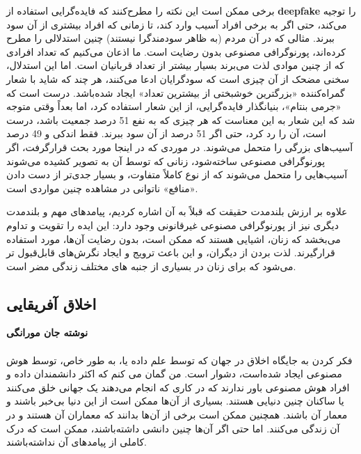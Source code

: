 برخی ممکن است این نکته را مطرح‌کنند که فایده‌گرایی استفاده از \textenglish{\textbf{deepfake}} را توجیه می‌کند، حتی اگر به برخی افراد آسیب وارد کند، تا زمانی که افراد بیشتری از آن سود ببرند.
مثالی که در آن مردم (به ظاهر سودمند‌گرا نیستند) چنین استدلالی را مطرح کرده‌اند، پورنوگرافی مصنوعی بدون رضایت است.
ما اذعان می‌کنیم که تعداد افرادی که از چنین موادی لذت می‌برند بسیار بیشتر از تعداد قربانیان است.
اما این استدلال، سخنی مضحک از آن چیزی است که سودگرایان ادعا می‌کنند، هر چند که شاید با شعار گمراه‌کننده «بزرگترین خوشبختی از بیشترین تعداد» ایجاد شده‌باشد.
درست است که «جرمی بنتام»، بنیانگذار فایده‌گرایی، از این شعار استفاده کرد، اما بعداً وقتی متوجه شد که این شعار به این معناست که هر چیزی که به نفع 51 درصد جمعیت باشد، درست است، آن را رد کرد، حتی اگر 51 درصد از آن سود ببرند.
فقط اندکی و 49 درصد آسیب‌های بزرگی را متحمل می‌شوند.
در موردی که در اینجا مورد بحث قرار‌گرفت، اگر پورنوگرافی مصنوعی ساخته‌شود، زنانی که توسط آن به تصویر کشیده می‌شوند آسیب‌هایی را متحمل می‌شوند که از نوع کاملاً متفاوت، و بسیار جدی‌تر از دست دادن «منافع» ناتوانی در مشاهده چنین مواردی است.

علاوه بر ارزش بلندمدت حقیقت که قبلاً به آن اشاره کردیم، پیامدهای مهم و بلندمدت دیگری نیز از پورنوگرافی مصنوعی غیرقانونی وجود دارد: این ایده را تقویت و تداوم می‌بخشد که زنان، اشیایی هستند که ممکن است، بدون رضایت آن‌ها، مورد استفاده قرار‌گیرند.
لذت بردن از دیگران، و این باعث ترویج و ایجاد نگرش‌های قابل‌قبول تر می‌شود که برای زنان در بسیاری از جنبه های مختلف زندگی مضر است.
\newline
\newline


{
\subsection*{اخلاق آفریقایی}
\label{subsec:اخلاق آفریقایی}
\noindent \textbf{نوشته جان مورانگی}
\\\\
فکر کردن به جایگاه اخلاق در جهان که توسط علم داده یا، به طور خاص، توسط هوش مصنوعی ایجاد شده‌است، دشوار است. من گمان می کنم که اکثر دانشمندان داده و افراد هوش مصنوعی باور ندارند که در کاری که انجام می‌دهند یک جهانی خلق می‌کنند یا ساکنان چنین دنیایی هستند. بسیاری از آن‌ها ممکن است از این دنیا بی‌خبر باشند و معمار آن باشند. همچنین ممکن است برخی از آن‌ها بدانند که معماران آن هستند و در آن زندگی می‌کنند. اما حتی اگر آن‌ها چنین دانشی داشته‌باشند، ممکن است که درک کاملی از پیامدهای آن نداشته‌باشند.
}

